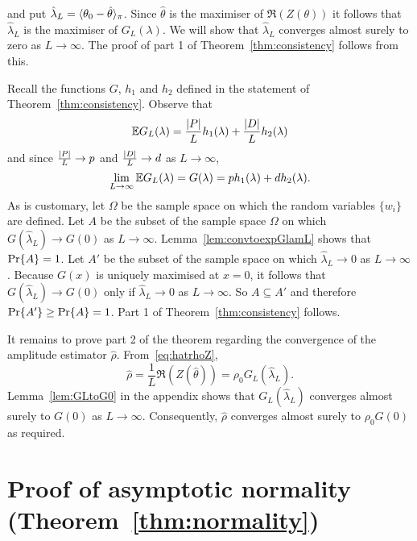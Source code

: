 \documentclass[journal]{IEEEtran}
\begin{document}
and put $\hat{\lambda}_L = \langle \theta_0 - \hat{\theta} \rangle_\pi$.  Since $\hat{\theta}$ is the maximiser of $\Re(Z(\theta))$ it follows that $\hat{\lambda}_L$ is the maximiser of $G_L(\lambda)$.  We will show that $\hat{\lambda}_L$ converges almost surely to zero as $L \rightarrow \infty$.  The proof of part 1 of Theorem~\ref{thm:consistency} follows from this.

Recall the functions $G$, $h_1$ and $h_2$ defined in the statement of Theorem~\ref{thm:consistency}.  Observe that
\[
{\mathbb E} G_L(\lambda) = \frac{{\left\vert P \right\vert}}{L} h_1(\lambda) + \frac{{\left\vert D \right\vert}}{L} h_2(\lambda)
\]
and since $\frac{{\left\vert P \right\vert}}{L} \rightarrow p$ and $\frac{{\left\vert D \right\vert}}{L} \rightarrow d$ as $L \rightarrow \infty$,
\[
\lim_{L \rightarrow\infty} {\mathbb E} G_L(\lambda) = G(\lambda) = p h_1(\lambda)   +  d h_2(\lambda).
\]
As is customary, let $\Omega$ be the sample space on which the random variables $\{w_i\}$ are defined.  Let $A$ be the subset of the sample space $\Omega$ on which $G(\hat{\lambda}_L) \rightarrow G(0)$ as $L\rightarrow\infty$.  Lemma~\ref{lem:convtoexpGlamL} shows that ${\operatorname{Pr}}\{A\} = 1$.  Let $A'$ be the subset of the sample space on which $\hat{\lambda}_L \rightarrow 0$ as $L\rightarrow \infty$.  Because $G(x)$ is uniquely maximised at $x=0$, it follows that $G(\hat{\lambda}_L) \rightarrow G(0)$ only if $\hat{\lambda}_L \rightarrow 0$ as $L \rightarrow\infty$. So $A \subseteq A'$ and therefore ${\operatorname{Pr}}\{A'\} \geq {\operatorname{Pr}}\{A\} = 1$.  Part 1 of Theorem~\ref{thm:consistency} follows.  

It remains to prove part 2 of the theorem regarding the convergence of the amplitude estimator $\hat{\rho}$.  From~\eqref{eq:hatrhoZ},
\begin{equation}\label{eq:rhoGLZ}
\hat{\rho} = \frac{1}{L}\Re(Z(\hat{\theta})) = \rho_0 G_L(\hat{\lambda}_L).
\end{equation} 
Lemma~\ref{lem:GLtoG0} in the appendix shows that $G_L(\hat{\lambda}_L)$ converges almost surely to $G(0)$ as $L\rightarrow\infty$.  Consequently, $\hat{\rho}$ converges almost surely to $\rho_0 G(0)$ as required.  %


\section{Proof of asymptotic normality (Theorem~\ref{thm:normality}) } \label{sec:proof-asympt-norm}
\end{document}
